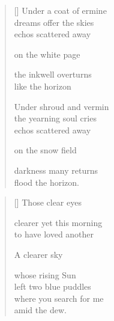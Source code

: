 \documentclass[14pt]{extbook}
\newcommand*{\centeredornament}{\centerline{\pgfornament[width=6cm]{88}}}
\begin{document}

\newpage

\vspace*{-15mm}
\centeredornament
\vspace*{-7mm}


\settowidth{\versewidth}{Under shroud and vermin}

\begin{verse}[\versewidth]
  Under a coat of ermine \\
  dreams offer the skies \\
  echos scattered away

  on the white page

  the inkwell overturns \\
  like the horizon

  Under shroud and vermin \\
  the yearning soul cries \\
  echos scattered away

  on the snow field

  darkness many returns \\
  flood the horizon.
\end{verse}


\newpage

\vspace*{-15mm}
\centeredornament
\vspace*{-7mm}


\settowidth{\versewidth}{where you search for me}

\begin{verse}[\versewidth]
  Those clear eyes

  clearer yet this morning \\
  to have loved another

  A clearer sky

  whose rising Sun \\
  left two blue puddles \\
  where you search for me \\
  amid the dew.
\end{verse}

\end{document}
